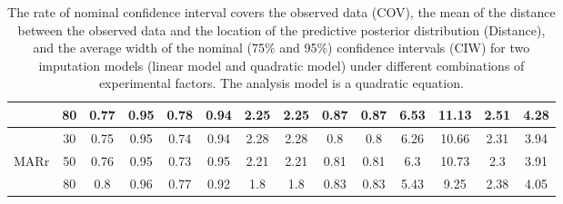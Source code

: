 \begin{table}
\begin{tabular}{cc|cccc|cccc|cccc}
			\multicolumn{1}{c|}{}     & 80                    & 0.77                       & 0.95                       & 0.78                       & 0.94                        & 2.25                       & 2.25                       & 0.87                       & 0.87                        & 6.53                       & 11.13                      & 2.51                       & 4.28                       \\\hline
			\multicolumn{1}{c|}{}     & 30                    & 0.75                       & 0.95                       & 0.74                       & 0.94                        & 2.28                       & 2.28                       & 0.8                        & 0.8                         & 6.26                       & 10.66                      & 2.31                       & 3.94                       \\
			\multicolumn{1}{c|}{MARr} & 50                    & 0.76                       & 0.95                       & 0.73                       & 0.95                        & 2.21                       & 2.21                       & 0.81                       & 0.81                        & 6.3                        & 10.73                      & 2.3                        & 3.91                       \\
			\multicolumn{1}{c|}{}     & 80                    & 0.8                        & 0.96                       & 0.77                       & 0.92                        & 1.8                        & 1.8                        & 0.83                       & 0.83                        & 5.43                       & 9.25                       & 2.38                       & 4.05                      
		\end{tabular}
		\caption{The rate of nominal confidence interval covers the observed data (COV), the mean of the distance between the observed data and the location of the predictive posterior distribution (Distance), and the average width of the nominal (75\% and 95\%) confidence intervals (CIW) for two imputation models (linear model and quadratic model) under different combinations of experimental factors. The analysis model is a quadratic equation.}
		\label{tab6_1}
	\end{table}
	
